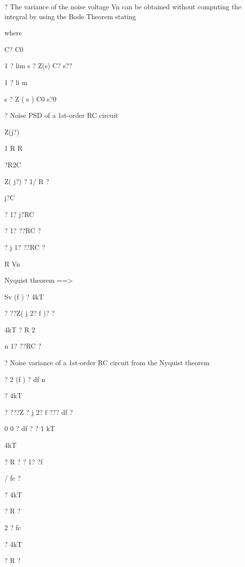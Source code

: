 \documentclass[2pt,landscape]{article}
\begin{document}
\begin{multicols*}{5}
?	The variance of the noise voltage Vn can be obtained without 
computing the integral by using the Bode Theorem stating

where



C?	C0













1 ? lim s ? Z(s)
C?	s??


1 
? 
li
m

s 
? 
Z
(
s
)
C0	s?0



?	Noise PSD of a 1st-order RC circuit




Z(j?)



1	R	R


?R2C


Z( j?) ?
1/ R ?


j?C


? 1? j?RC


?
1? ??RC ?


?	j
1? ??RC ?


R	Vn



Nyquist theorem
==>


Sv (f ) ? 4kT


? ??Z( j 2? f )? ?


4kT ? R
2



n	1? ??RC ?


?	Noise variance of a 1st-order RC circuit from the Nyquist theorem





?
2	(f ) ? df
n


? 4kT




? ???Z ? j 2? f ??? df ?


0	0
?	df	?	?	1	kT


4kT


? R ? ? 1? ?f


/ fc ?


? 4kT


? R ?


2 ? fc


? 4kT


? R ?



\end{multicols*}
\end{document}
